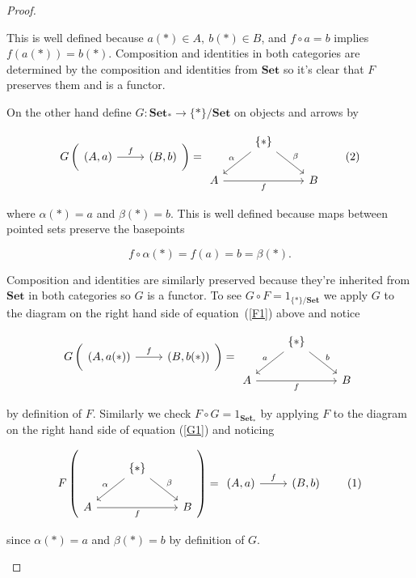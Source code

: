\documentclass[11pt]{amsart}
\theoremstyle{plain}
\theoremstyle{definition}
\newcommand{\Set}{{\mathbf{Set}}}
\newcommand{\noi}{{\noindent}}
\begin{document}
\begin{proof}
\begin{enumerate}
\noi This is well defined because $a(*) \in A, \ b(*) \in B$, and $f\circ a = b $ implies $f(a(*)) = b(*)$. Composition and identities in both categories are determined by the composition and identities from $\Set$ so it's clear that $F$ preserves them and is a functor. \medskip 

On the other hand define $G : \Set_* \to \{*\}/\Set$ on objects and arrows by 

\[ \label{G1}G\left( \begin{tikzcd}
    (A,a) \rar["f"] & (B,b) 
    \end{tikzcd}  \right) = \begin{tikzcd}
    & \{*\} \ar[dl, "\alpha"'] \ar[dr, "\beta"] & \\
    A \rar[rr,"f"'] && B
    \end{tikzcd} \tag{2}
    \]

\noi where $\alpha(*) = a$ and $\beta(*) = b$. This is well defined because maps between pointed sets preserve the basepoints 

\[ f \circ \alpha (*) = f(a) = b = \beta(*). \]

\noi Composition and identities are similarly preserved because they're inherited from $\Set$ in both categories so $G$ is a functor. To see $G \circ F = 1_{\{*\}/\Set}$ we apply $G$ to the diagram on the right hand side of equation~(\ref{F1}) above and notice

\[ G\left( \begin{tikzcd}
    (A,a(*)) \rar["f"] & (B,b(*)) 
    \end{tikzcd}  \right) = \begin{tikzcd}
    & \{*\} \ar[dl, "a"'] \ar[dr, "b"] & \\
    A \rar[rr,"f"'] && B
    \end{tikzcd} \]

\noi by definition of $F$. Similarly we check $F \circ G = 1_{\Set_*}$ by applying $F$ to the diagram on the right hand side of equation (\ref{G1}) and noticing 

\[ \label{F1} 
F\left( \begin{tikzcd}
& \{*\} \ar[dl, "\alpha"'] \ar[dr, "\beta"] & \\
A \rar[rr,"f"'] && B
\end{tikzcd} \right) =  
\begin{tikzcd}
(A,a) \rar["f"] & (B,b) 
\end{tikzcd} \tag{1}
\]

\noi since $\alpha(*) = a$ and $\beta(*)=b$ by definition of $G$.\medskip 


\end{enumerate}
\end{proof}
\end{document}
